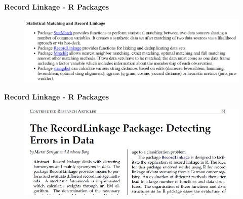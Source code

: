 \documentclass{beamer}
\begin{document}
\begin{frame}
	\Large
	\textbf{Record Linkage - R Packages}
	\begin{figure}
\centering
\includegraphics[width=1.4\linewidth]{Rpackages}

\end{figure}

	
\end{frame}
	\begin{frame}
		\Large
		\textbf{Record Linkage - R Packages}
		\begin{figure}
			\centering
			\includegraphics[width=1.1\linewidth]{Rpackages2}
			
		\end{figure}
		
		
	\end{frame}
\end{document}
